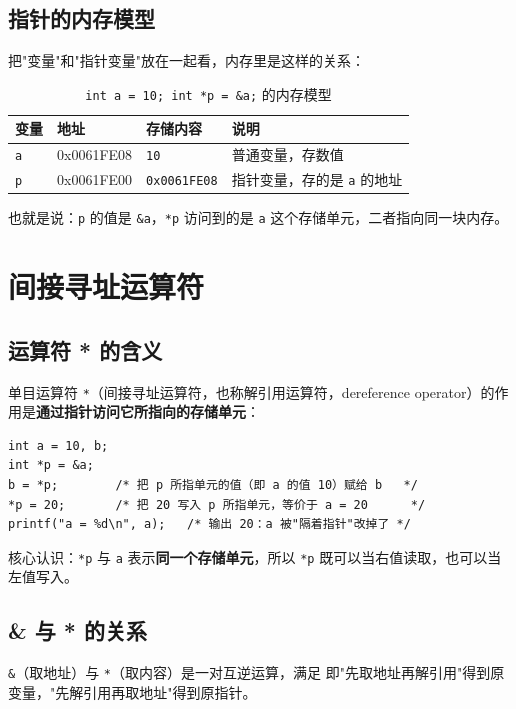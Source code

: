 \subsection{指针的内存模型}
把"变量"和"指针变量"放在一起看，内存里是这样的关系：
\begin{table}[htbp]
\centering
\caption{\texttt{int a = 10; int *p = \&a;} 的内存模型}
\footnotesize
\begin{tabular}{@{}llll@{}}
\toprule
变量 & 地址 & 存储内容 & 说明 \\
\midrule
\texttt{a} & 0x0061FE08 & \texttt{10} & 普通变量，存数值 \\
\texttt{p} & 0x0061FE00 & \texttt{0x0061FE08} & 指针变量，存的是 \texttt{a} 的地址 \\
\bottomrule
\end{tabular}
\end{table}

也就是说：\texttt{p} 的值是 \texttt{\&a}，\texttt{*p} 访问到的是 \texttt{a} 这个存储单元，二者指向同一块内存。

\section{间接寻址运算符}
\subsection{运算符 * 的含义}
单目运算符 \texttt{*}（间接寻址运算符，也称解引用运算符，dereference operator）的作用是\textbf{通过指针访问它所指向的存储单元}：
\begin{lstlisting}
int a = 10, b;
int *p = &a;
b = *p;        /* 把 p 所指单元的值（即 a 的值 10）赋给 b   */
*p = 20;       /* 把 20 写入 p 所指单元，等价于 a = 20      */
printf("a = %d\n", a);   /* 输出 20：a 被"隔着指针"改掉了 */
\end{lstlisting}
核心认识：\texttt{*p} 与 \texttt{a} 表示\textbf{同一个存储单元}，所以 \texttt{*p} 既可以当右值读取，也可以当左值写入。

\subsection{\& 与 * 的关系}
\texttt{\&}（取地址）与 \texttt{*}（取内容）是一对互逆运算，满足
即"先取地址再解引用"得到原变量，"先解引用再取地址"得到原指针。

